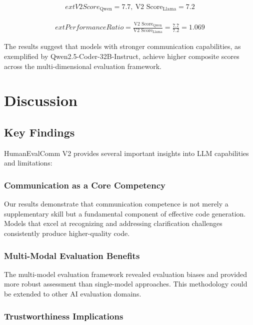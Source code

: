 \documentclass[conference]{IEEEtran}
\begin{document}
\begin{align}
	ext{V2 Score}_{\text{Qwen}} = 7.7,\ \text{V2 Score}_{\text{Llama}} = 7.2
\end{align}

\begin{align}
	ext{Performance Ratio} = \frac{\text{V2 Score}_{\text{Qwen}}}{\text{V2 Score}_{\text{Llama}}} = \frac{7.7}{7.2} = 1.069
\end{align}

The results suggest that models with stronger communication capabilities, as exemplified by Qwen2.5-Coder-32B-Instruct, achieve higher composite scores across the multi-dimensional evaluation framework.

\section{Discussion}

\subsection{Key Findings}

HumanEvalComm V2 provides several important insights into LLM capabilities and limitations:

\subsubsection{Communication as a Core Competency}

Our results demonstrate that communication competence is not merely a supplementary skill but a fundamental component of effective code generation. Models that excel at recognizing and addressing clarification challenges consistently produce higher-quality code.

\subsubsection{Multi-Modal Evaluation Benefits}

The multi-model evaluation framework revealed evaluation biases and provided more robust assessment than single-model approaches. This methodology could be extended to other AI evaluation domains.

\subsubsection{Trustworthiness Implications}
\end{document}
